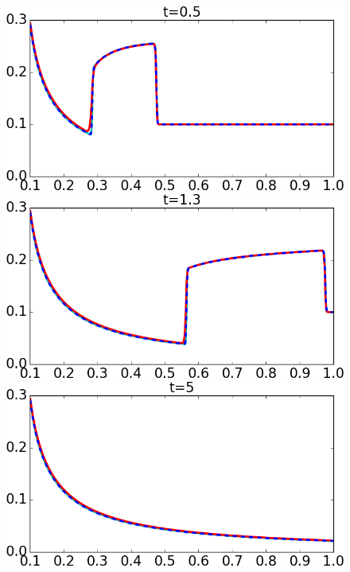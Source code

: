 \documentclass[preprint, 11pt]{article}
\begin{document}
\begin{figure}[!h]
  {\scriptsize
    \includegraphics[scale=0.29]{figures/outflow_1D_t0p5.png}
    \qquad
    \includegraphics[scale=0.29]{figures/outflow_1D_t1p3.png}
    \qquad
    \includegraphics[scale=0.29]{figures/outflow_1D_t10p0.png}

}
\end{figure}
\end{document}
